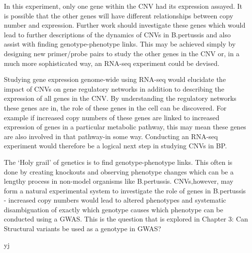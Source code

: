 \documentclass{article}
\begin{document}
In this experiment, only one gene within the CNV had its expression assayed.  It is possible that the other genes will have different relationships between copy number and expression. Further work should investigate these genes which would lead to further descriptions of the dynamics of CNVs in B.pertussis and also assist with finding genotype-phenotype links. This may be achieved simply by designing new primer/probe pairs to study the other genes in the CNV or, in a much more sophisticated way, an RNA-seq experiment could be devised. 

Studying gene expression genome-wide using RNA-seq would elucidate the impact of CNVs on gene regulatory networks in addition to describing the expression of all  genes in the CNV. By understanding the regulatory networks these genes are in, the role of these genes in the cell can be discovered. For example if increased copy numbers of these genes are linked to increased expression of genes in a particular metabolic pathway, this may mean these genes are also involved in that pathway-in some way. Conducting an RNA-seq experiment would therefore be a logical next step in studying  CNVs in BP.


The `Holy grail' of genetics is to find genotype-phenotype links. This often is done by creating knockouts and observing phenotype changes which can be a lengthy process in non-model organisms like B.pertussis. CNVs,however, may form a natural experimental system to investigate the role of genes in B.pertussis - increased copy numbers would lead to altered phenotypes and systematic disambiguation of exactly which genotype causes which phenotype can be conducted using a GWAS. This is the question that is explored in Chapter 3: Can Structural variants be used as a genotype in GWAS?




yj
\end{document}
